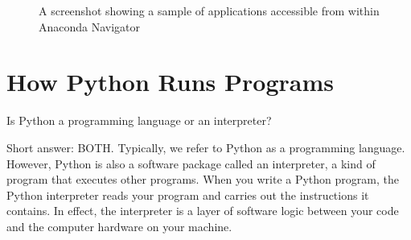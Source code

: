\documentclass[a4paper,11pt]{book}
\newcommand{\question}[1]{%
    \begin{tcolorbox}[colback=comp_c!10,colframe=comp_c,sidebyside align=top,width=\linewidth,before skip=1ex]
        #1
    \end{tcolorbox}
    \switchcolumn%
}
\newcommand{\note}[1]{%
    \begin{tcolorbox}[colback=white!0,colframe=white!10,width=\linewidth,before skip=1ex]
        #1
    \end{tcolorbox}
}
\begin{document}
\begin{figure}
	\centering 
	\caption{A screenshot showing a sample of applications accessible from within Anaconda Navigator}
	\label{fig:anaconda_nav}
\end{figure}
\clearpage

\section{How Python Runs Programs}

\begin{paracol}{2}
	\question{Is Python a programming language or an interpreter?}
	\note{Short answer: BOTH. Typically, we refer to Python as a programming language. However, Python is also a software package called an interpreter, a kind of program that executes other programs. When you write a Python program, the Python interpreter reads your program and carries out the instructions it contains. In effect, the interpreter is a layer of software logic between your code and the computer hardware on your machine.
	}
\end{paracol}	
\end{document}
